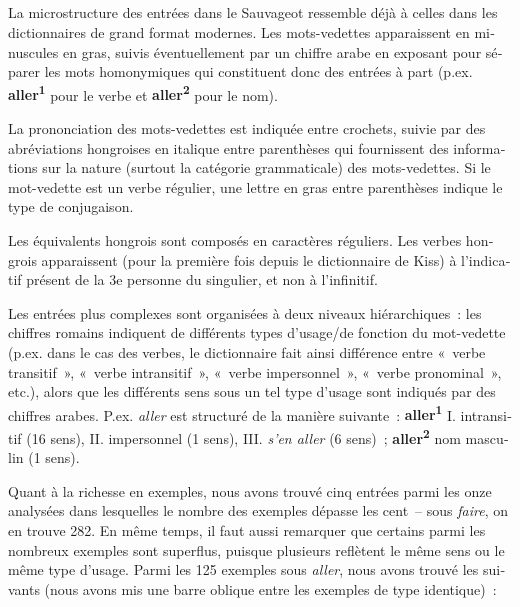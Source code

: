 \documentclass[output=paper,colorlinks,citecolor=brown,arabicfont,chinesefont,booklanguage=french]{langscibook}
\begin{document}
\begin{otherlanguage}{french}
\subsection{\citealt{Sauvageot1932} }\label{sec:tillinger:3.6}

La microstructure des entrées dans le Sauvageot ressemble déjà à celles dans les dictionnaires de grand format modernes. Les mots-vedettes apparaissent en minuscules en gras, suivis éventuellement par un chiffre arabe en exposant pour séparer les mots homonymiques qui constituent donc des entrées à part (p.ex. \textbf{aller\textsuperscript{1}} pour le verbe et \textbf{aller\textsuperscript{2}} pour le nom). 

La prononciation des mots-vedettes est indiquée entre crochets, suivie par des abréviations hongroises en italique entre parenthèses qui fournissent des informations sur la nature (surtout la catégorie grammaticale) des mots-vedettes. Si le mot-vedette est un verbe régulier, une lettre en gras entre parenthèses indique le type de conjugaison. 

Les équivalents hongrois sont composés en caractères réguliers. Les verbes hongrois apparaissent (pour la première fois depuis le dictionnaire de Kiss) à l’indicatif présent de la 3e personne du singulier, et non à l’infinitif. 

Les entrées plus complexes sont organisées à deux niveaux hiérarchiques~: les chiffres romains indiquent de différents types d’usage/de fonction du mot-vedette (p.ex. dans le cas des verbes, le dictionnaire fait ainsi différence entre «~verbe transitif~», «~verbe intransitif~», «~verbe impersonnel~», «~verbe pronominal~», etc.), alors que les différents sens sous un tel type d’usage sont indiqués par des chiffres arabes. P.ex. \emph{aller} est structuré de la manière suivante~: \textbf{aller\textsuperscript{1}} I. intransitif (16 sens), II. impersonnel (1 sens), III. \emph{s’en aller} (6 sens)~; \textbf{aller\textsuperscript{2}} nom masculin (1 sens).

Quant à la richesse en exemples, nous avons trouvé cinq entrées parmi les onze analysées dans lesquelles le nombre des exemples dépasse les cent~-- sous \emph{faire}, on en trouve 282. En même temps, il faut aussi remarquer que certains parmi les nombreux exemples sont superflus, puisque plusieurs reflètent le même sens ou le même type d’usage. Parmi les 125 exemples sous \emph{aller}, nous avons trouvé les suivants (nous avons mis une barre oblique entre les exemples de type identique)~:


\end{otherlanguage}
\end{document}
